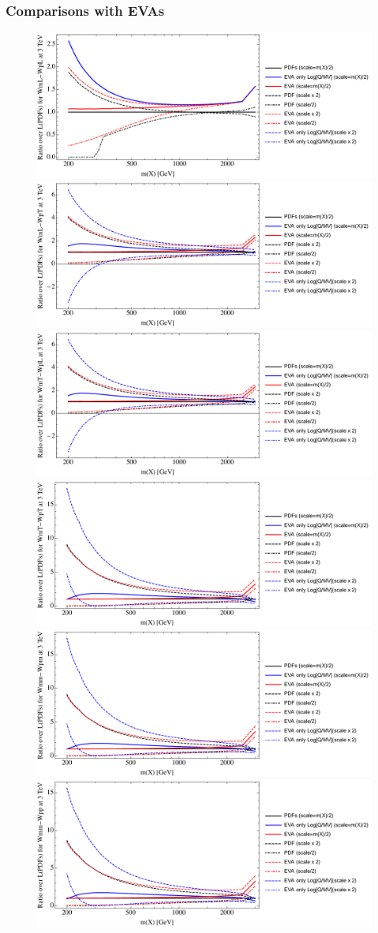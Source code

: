 \documentclass[a4paper,11pt]{article}
\begin{document}
\clearpage
\subsubsection{Comparisons with EVAs}



\begin{figure}[ht]
\includegraphics[width=0.46\linewidth]{PlotLumi/3TeV/ratios/WmL-WpL.pdf}
\includegraphics[width=0.46\linewidth]{PlotLumi/3TeV/ratios/WmL-WpT.pdf}
\includegraphics[width=0.46\linewidth]{PlotLumi/3TeV/ratios/WmT-WpL.pdf}
\includegraphics[width=0.46\linewidth]{PlotLumi/3TeV/ratios/WmT-WpT.pdf}
\includegraphics[width=0.46\linewidth]{PlotLumi/3TeV/ratios/Wmm-Wpm.pdf}
\includegraphics[width=0.46\linewidth]{PlotLumi/3TeV/ratios/Wmm-Wpp.pdf}
\end{figure}
\end{document}
